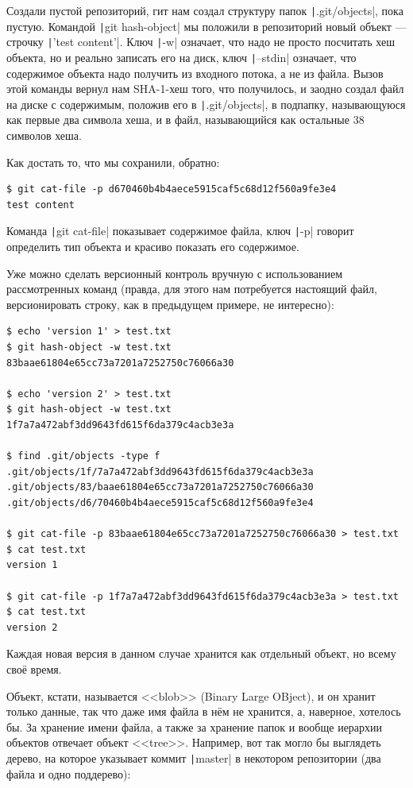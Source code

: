 \documentclass{../../text-style}
\begin{document}
Создали пустой репозиторий, гит нам создал структуру папок \texttt|.git/objects|, пока пустую. Командой \texttt|git hash-object| мы положили в репозиторий новый объект --- строчку \texttt|'test content'|. Ключ \texttt|-w| означает, что надо не просто посчитать хеш объекта, но и реально записать его на диск, ключ \texttt|--stdin| означает, что содержимое объекта надо получить из входного потока, а не из файла. Вызов этой команды вернул нам SHA-1-хеш того, что получилось, и заодно создал файл на диске с содержимым, положив его в \texttt|.git/objects|, в подпапку, называющуюся как первые два символа хеша, и в файл, называющийся как остальные 38 символов хеша.

Как достать то, что мы сохранили, обратно:
\begin{verbatim}
$ git cat-file -p d670460b4b4aece5915caf5c68d12f560a9fe3e4
test content
\end{verbatim}

Команда \texttt|git cat-file| показывает содержимое файла, ключ \texttt|-p| говорит определить тип объекта и красиво показать его содержимое.

Уже можно сделать версионный контроль вручную с использованием рассмотренных команд (правда, для этого нам потребуется настоящий файл, версионировать строку, как в предыдущем примере, не интересно):

\begin{verbatim}
$ echo 'version 1' > test.txt
$ git hash-object -w test.txt
83baae61804e65cc73a7201a7252750c76066a30

$ echo 'version 2' > test.txt
$ git hash-object -w test.txt
1f7a7a472abf3dd9643fd615f6da379c4acb3e3a

$ find .git/objects -type f
.git/objects/1f/7a7a472abf3dd9643fd615f6da379c4acb3e3a
.git/objects/83/baae61804e65cc73a7201a7252750c76066a30
.git/objects/d6/70460b4b4aece5915caf5c68d12f560a9fe3e4

$ git cat-file -p 83baae61804e65cc73a7201a7252750c76066a30 > test.txt
$ cat test.txt
version 1

$ git cat-file -p 1f7a7a472abf3dd9643fd615f6da379c4acb3e3a > test.txt
$ cat test.txt
version 2
\end{verbatim}

Каждая новая версия в данном случае хранится как отдельный объект, но всему своё время.

Объект, кстати, называется <<blob>> (Binary Large OBject), и он хранит только данные, так что даже имя файла в нём не хранится, а, наверное, хотелось бы. За хранение имени файла, а также за хранение папок и вообще иерархии объектов отвечает объект <<tree>>. Например, вот так могло бы выглядеть дерево, на которое указывает коммит \texttt|master| в некотором репозитории (два файла и одно поддерево):
\end{document}
